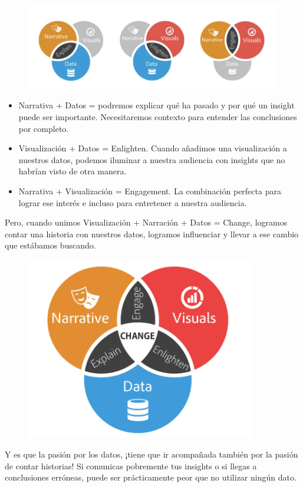 \documentclass[preprint,12pt]{elsarticle}
\begin{document}
			\begin{figure}[htb]
				\begin{center}
					\includegraphics[width=18cm]{./Imagenes/img1}
				\end{center}
			\end{figure}
\begin{itemize}
		\item Narrativa + Datos = podremos explicar qué ha pasado y por qué un insight puede ser importante. Necesitaremos contexto para entender las 	conclusiones por completo.
		\item Visualización + Datos = Enlighten. Cuando añadimos una visualización a nuestros datos, podemos iluminar a nuestra audiencia con insights que no habrían visto de otra manera.
		\item Narrativa + Visualización = Engagement. La combinación perfecta para lograr ese interés e incluso para entretener a nuestra audiencia. 
	\end{itemize}

Pero, cuando unimos Visualización + Narración + Datos = Change, logramos contar una historia con nuestros datos, logramos influenciar y llevar a ese cambio que estábamos buscando.
\begin{figure}[htb]
				\begin{center}
					\includegraphics[width=10cm]{./Imagenes/img2}
				\end{center}
			\end{figure}
Y es que la pasión por los datos, ¡tiene que ir acompañada también por la pasión de contar historias! Si comunicas pobremente tus insights o si llegas a conclusiones erróneas, puede ser prácticamente peor que no utilizar ningún dato.
\end{document}
